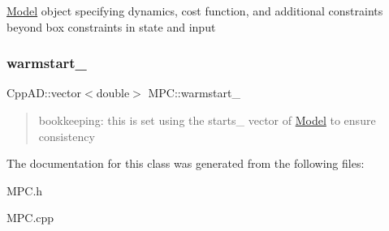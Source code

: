 \mbox{\hyperlink{classModel}{Model}} object specifying dynamics, cost function, and additional constraints beyond box constraints in state and input \mbox{\label{classMPC_a303dcbda2e7d051f5f8a34e01bc414bc}} 
\subsubsection{\texorpdfstring{warmstart\+\_\+}{warmstart\_}}
{\footnotesize\ttfamily Cpp\+A\+D\+::vector$<$double$>$ M\+P\+C\+::warmstart\+\_\+\hspace{0.3cm}{\ttfamily [protected]}}

\begin{quote}
bookkeeping\+: this is set using the starts\+\_\+ vector of \mbox{\hyperlink{classModel}{Model}} to ensure consistency \end{quote}


The documentation for this class was generated from the following files\+:\begin{DoxyCompactItemize}
\item 
M\+P\+C.\+h\item 
M\+P\+C.\+cpp\end{DoxyCompactItemize}
